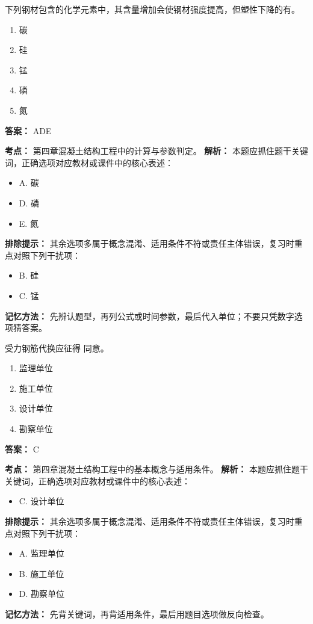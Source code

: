 \documentclass[UTF8,fontset=fandol,11pt]{ctexart}
\begin{document}
\begin{quizbox}[title={第 12 题}]
下列钢材包含的化学元素中，其含量增加会使钢材强度提高，但塑性下降的有。\\
\begin{enumerate}[label=\Alph*.]
\item 碳
\item 硅
\item 锰
\item 磷
\item 氮
\end{enumerate}
\textbf{答案：} ADE
\vspace{0.25em}
\begin{answerbox}[title={考点解析}]
\textbf{考点：} 第四章混凝土结构工程中的计算与参数判定。
\textbf{解析：} 本题应抓住题干关键词，正确选项对应教材或课件中的核心表述：
\begin{itemize}
\item A. 碳
\item D. 磷
\item E. 氮
\end{itemize}
\textbf{排除提示：} 其余选项多属于概念混淆、适用条件不符或责任主体错误，复习时重点对照下列干扰项：
\begin{itemize}
\item B. 硅
\item C. 锰
\end{itemize}
\textbf{记忆方法：} 先辨认题型，再列公式或时间参数，最后代入单位；不要只凭数字选项猜答案。
\end{answerbox}
\end{quizbox}

\begin{quizbox}[title={第 13 题}]
受力钢筋代换应征得 同意。\\
\begin{enumerate}[label=\Alph*.]
\item 监理单位
\item 施工单位
\item 设计单位
\item 勘察单位
\end{enumerate}
\textbf{答案：} C
\vspace{0.25em}
\begin{answerbox}[title={考点解析}]
\textbf{考点：} 第四章混凝土结构工程中的基本概念与适用条件。
\textbf{解析：} 本题应抓住题干关键词，正确选项对应教材或课件中的核心表述：
\begin{itemize}
\item C. 设计单位
\end{itemize}
\textbf{排除提示：} 其余选项多属于概念混淆、适用条件不符或责任主体错误，复习时重点对照下列干扰项：
\begin{itemize}
\item A. 监理单位
\item B. 施工单位
\item D. 勘察单位
\end{itemize}
\textbf{记忆方法：} 先背关键词，再背适用条件，最后用题目选项做反向检查。
\end{answerbox}
\end{quizbox}
\end{document}
